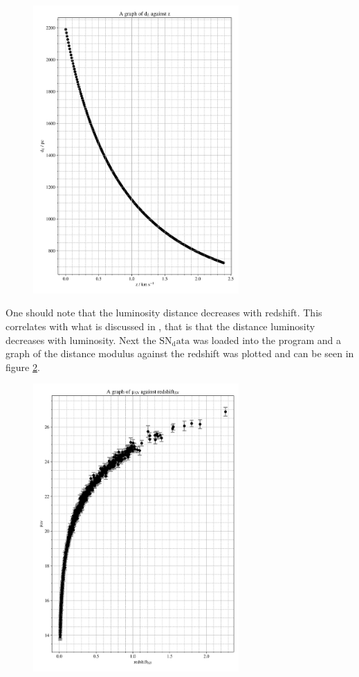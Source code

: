 \documentclass[12pt, a4paper]{article}
\begin{document}
\begin{figure}[H]
    \centering
    \includegraphics[width = 0.7\textwidth]{Graph 2.png}
    \label{fig:luminosity~vs~redhsift}
\end{figure}

One should note that the luminosity distance decreases with redshift. This correlates with what is discussed in \parencite{pettiniHUBBLEDIAGRAMTYPE}, that is that the distance luminosity decreases with luminosity. Next the \(\mathrm{SN_data}\) was loaded into the program and a graph of the distance modulus against the redshift was plotted and can be seen in figure \ref{fig:distance~modulus~vs~redshift~sn}.

\begin{figure}[H]
    \centering
    \includegraphics[width = 0.7\textwidth]{Graph 3.png}
    \label{fig:distance~modulus~vs~redshift~sn}
\end{figure}
\end{document}
